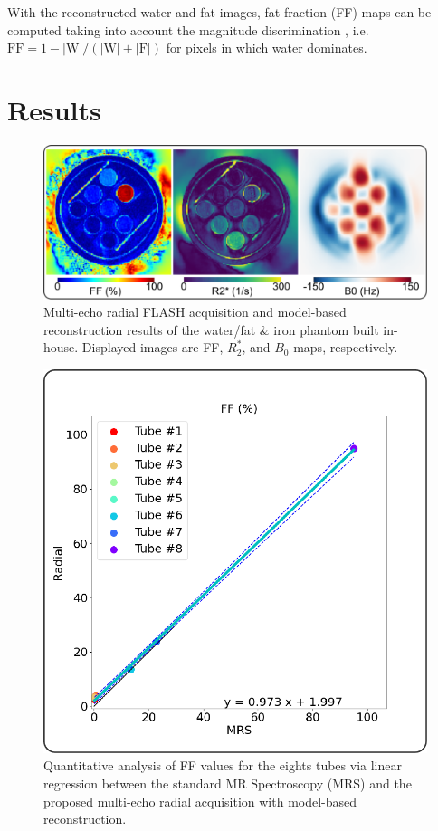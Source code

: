 \documentclass[journal,twoside,web]{ieeecolor}
\begin{document}
With the reconstructed water and fat images, fat fraction (FF) maps can be computed 
taking into account the magnitude discrimination \cite{liu_2007_ff}, 
i.e.~$\text{FF} = 1 - |\text{W}| / (|\text{W}| + |\text{F}|)$ 
for pixels in which water dominates. 



\section{Results}

\begin{figure}
	\centering
	\includegraphics[width=\columnwidth]{../../figures/tan3.pdf}
	\caption{Multi-echo radial FLASH acquisition and 
		model-based reconstruction results 
		of the water/fat \& iron phantom built in-house. 
		Displayed images are FF, $R_2^*$, and $B_0$ maps, respectively.}
	\label{FIG:PHA}
\end{figure}

\begin{figure}
	\centering
	\includegraphics[width=\columnwidth]{../../figures/tan4.pdf}
	\caption{Quantitative analysis of FF values 
			for the eights tubes via linear regression 
			between the standard MR Spectroscopy (MRS) 
			and the proposed multi-echo radial acquisition 
			with model-based reconstruction.}
	\label{FIG:PHA_LINFIT}
\end{figure}
\end{document}

